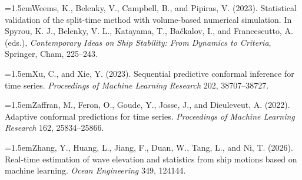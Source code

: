 \documentclass[11pt]{article}
\begin{document}
\hangindent=1.5em\noindent Weems, K., Belenky, V., Campbell, B., and Pipiras, V. (2023). Statistical validation of the split-time method with volume-based numerical simulation. In Spyrou, K. J., Belenky, V. L., Katayama, T., Ba\v{c}kalov, I., and Francescutto, A. (eds.), \emph{Contemporary Ideas on Ship Stability: From Dynamics to Criteria}, Springer, Cham, 225--243.\par
\hangindent=1.5em\noindent Xu, C., and Xie, Y. (2023). Sequential predictive conformal inference for time series. \emph{Proceedings of Machine Learning Research} 202, 38707--38727.\par
\hangindent=1.5em\noindent Zaffran, M., Feron, O., Goude, Y., Josse, J., and Dieuleveut, A. (2022). Adaptive conformal predictions for time series. \emph{Proceedings of Machine Learning Research} 162, 25834--25866.\par
\hangindent=1.5em\noindent Zhang, Y., Huang, L., Jiang, F., Duan, W., Tang, L., and Ni, T. (2026). Real-time estimation of wave elevation and statistics from ship motions based on machine learning. \emph{Ocean Engineering} 349, 124144.\par
\end{document}
